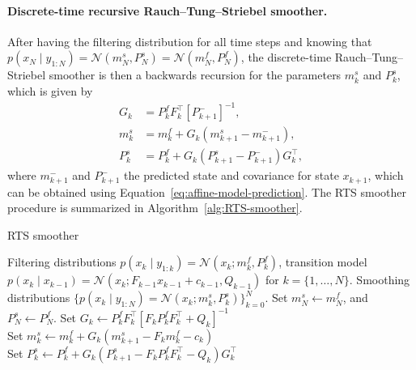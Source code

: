 \documentclass[dissertation,math,vertlayout,pdfa,colorlinks,nologo]{aaltoseries}
\begin{document}
\paragraph{\textbf{Discrete-time recursive Rauch–Tung–Striebel smoother.}} After having the filtering distribution for all time steps and knowing that $p(x_N \mid y_{1:N}) = \mathcal{N}(m^s_N, P^s_N) = \mathcal{N}(m^f_N, P^f_N)$, the discrete-time Rauch–Tung–Striebel smoother is then a backwards recursion for the
parameters $m^s_k$ and $P^s_k$, which is given by \citep[Theorem 12.2]{sarkka2023bayesian}
\begin{equation} \label{eq:affine-model-smoother}
    \begin{split}
        G_k &= P^f_k F_k^\top [P^-_{k+1}]^{-1},\\
        m^s_k &= m^f_k + G_k (m^s_{k+1} - m^-_{k+1}),\\
        P^s_k &= P^f_k + G_k (P^s_{k+1} - P^-_{k+1})G_k^\top,
    \end{split}
\end{equation}
where $m^-_{k+1}$ and $P^-_{k+1}$  the predicted state and covariance for state $x_{k+1}$, which can be obtained using Equation~\eqref{eq:affine-model-prediction}. The RTS smoother procedure is summarized in Algorithm~\ref{alg:RTS-smoother}.
\begin{algorithm}[!htb]
    \caption{RTS smoother}\label{alg:RTS-smoother}
    \begin{algorithmic}[1]
        \renewcommand{\algorithmicrequire}{\textbf{Input:}}
        \renewcommand{\algorithmicensure}{\textbf{Output:}}
        \REQUIRE Filtering distributions $p(x_k \mid y_{1: k}) = \mathcal{N}(x_k; m^f_k, P^f_k)$, transition model $p(x_k \mid x_{k-1}) = \mathcal{N}(x_k; F_{k-1} x_{k-1} + c_{k-1} , Q_{k-1})$ for $k = \{1, \ldots, N\}$.
        \ENSURE Smoothing distributions $\big\{p(x_k \mid y_{1: N})  = \mathcal{N}(x_k; m^s_k, P^s_k)\big\}_{k=0}^N$.
        \STATE Set $m^s_N \gets m^f_N$, and $P^s_N \gets P^f_N$.
            \STATE Set $G_k \gets P^f_k F_k^\top [F_{k} P^f_{k} F^\top_{k} + Q_{k}]^{-1}$\\[0.1cm]
            \STATE Set $m^s_k \gets m^f_k + G_k (m^s_{k+1} - F_{k} m^f_{k} - c_{k})$ \\[0.1cm]
            \STATE Set $P^s_k \gets P^f_k + G_k (P^s_{k+1} - F_{k} P^f_{k} F^\top_{k} - Q_{k})G_k^\top$
        \ENDFOR
    \end{algorithmic}
\end{algorithm}
%
\end{document}
